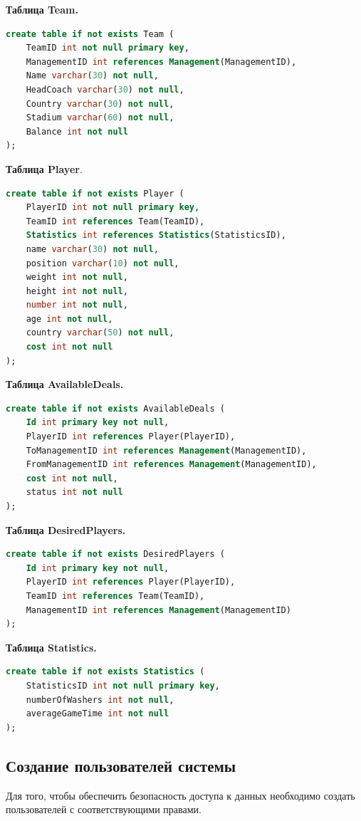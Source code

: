 \textbf{Таблица Team.}
\begin{lstlisting}[label={lst:Team},caption=Создание таблицы Management., language=SQL]
create table if not exists Team (
	TeamID int not null primary key,
	ManagementID int references Management(ManagementID),
	Name varchar(30) not null,
	HeadCoach varchar(30) not null,
	Country varchar(30) not null,
	Stadium varchar(60) not null,
	Balance int not null
);
\end{lstlisting}

\textbf{Таблица Player}.
\begin{lstlisting}[label={lst:Player},caption=Создание таблицы Player., language=SQL]
create table if not exists Player (
	PlayerID int not null primary key,
	TeamID int references Team(TeamID),
	Statistics int references Statistics(StatisticsID),
	name varchar(30) not null,
	position varchar(10) not null,
	weight int not null,
	height int not null,
	number int not null,
	age int not null,
	country varchar(50) not null,
	cost int not null
);
\end{lstlisting}

\textbf{Таблица AvailableDeals.}
\begin{lstlisting}[label={lst:AvailableDeals},caption=Создание таблицы AvailableDeals., language=SQL]
create table if not exists AvailableDeals (
	Id int primary key not null,
	PlayerID int references Player(PlayerID),
	ToManagementID int references Management(ManagementID),
	FromManagementID int references Management(ManagementID),
	cost int not null,
	status int not null
);
\end{lstlisting}

\textbf{Таблица DesiredPlayers.}
\begin{lstlisting}[label={lst:DesiredPlayers},caption=Создание таблицы AvailableDeals., language=SQL]
create table if not exists DesiredPlayers (
	Id int primary key not null,
	PlayerID int references Player(PlayerID),
	TeamID int references Team(TeamID),
	ManagementID int references Management(ManagementID)
); 
\end{lstlisting}

\textbf{Таблица Statistics.}
\begin{lstlisting}[label={lst:Statistics},caption=Создание таблицы AvailableDeals., language=SQL]
create table if not exists Statistics (
	StatisticsID int not null primary key,
	numberOfWashers int not null,
	averageGameTime int not null
);
\end{lstlisting}

\subsection{Создание пользователей системы}
Для того, чтобы обеспечить безопасность доступа к данных необходимо создать пользователей с соответствующими правами.


